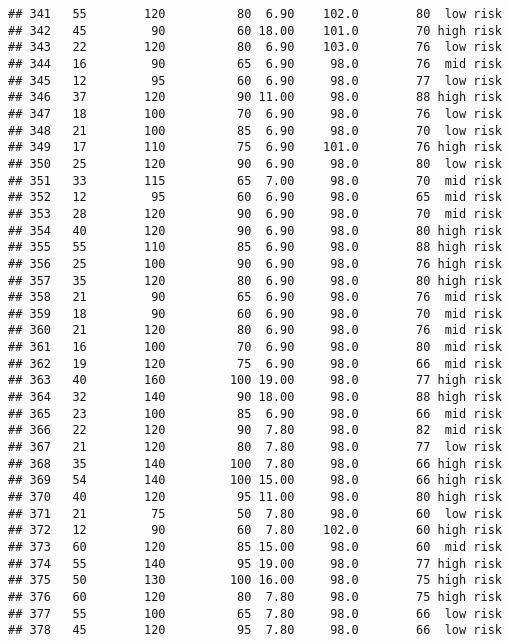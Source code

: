 \documentclass[
  ignorenonframetext,
]{beamer}
\begin{document}
\begin{frame}[fragile]
\begin{verbatim}
## 341   55        120          80  6.90    102.0        80  low risk
## 342   45         90          60 18.00    101.0        70 high risk
## 343   22        120          80  6.90    103.0        76  low risk
## 344   16         90          65  6.90     98.0        76  mid risk
## 345   12         95          60  6.90     98.0        77  low risk
## 346   37        120          90 11.00     98.0        88 high risk
## 347   18        100          70  6.90     98.0        76  low risk
## 348   21        100          85  6.90     98.0        70  low risk
## 349   17        110          75  6.90    101.0        76 high risk
## 350   25        120          90  6.90     98.0        80  low risk
## 351   33        115          65  7.00     98.0        70  mid risk
## 352   12         95          60  6.90     98.0        65  mid risk
## 353   28        120          90  6.90     98.0        70  mid risk
## 354   40        120          90  6.90     98.0        80 high risk
## 355   55        110          85  6.90     98.0        88 high risk
## 356   25        100          90  6.90     98.0        76 high risk
## 357   35        120          80  6.90     98.0        80 high risk
## 358   21         90          65  6.90     98.0        76  mid risk
## 359   18         90          60  6.90     98.0        70  mid risk
## 360   21        120          80  6.90     98.0        76  mid risk
## 361   16        100          70  6.90     98.0        80  mid risk
## 362   19        120          75  6.90     98.0        66  mid risk
## 363   40        160         100 19.00     98.0        77 high risk
## 364   32        140          90 18.00     98.0        88 high risk
## 365   23        100          85  6.90     98.0        66  mid risk
## 366   22        120          90  7.80     98.0        82  mid risk
## 367   21        120          80  7.80     98.0        77  low risk
## 368   35        140         100  7.80     98.0        66 high risk
## 369   54        140         100 15.00     98.0        66 high risk
## 370   40        120          95 11.00     98.0        80 high risk
## 371   21         75          50  7.80     98.0        60  low risk
## 372   12         90          60  7.80    102.0        60 high risk
## 373   60        120          85 15.00     98.0        60  mid risk
## 374   55        140          95 19.00     98.0        77 high risk
## 375   50        130         100 16.00     98.0        75 high risk
## 376   60        120          80  7.80     98.0        75 high risk
## 377   55        100          65  7.80     98.0        66  low risk
## 378   45        120          95  7.80     98.0        66  low risk

\end{verbatim}
\end{frame}
\end{document}
